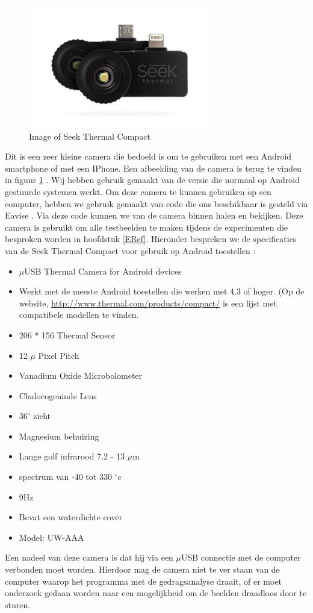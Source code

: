 \begin{figure}[hbp]
	\includegraphics[scale=0.75]{SeekThermalCompac}
	\caption{Image of Seek Thermal Compact}
	\label{imgSTC}
\end{figure}
Dit is een zeer kleine camera die bedoeld is om te gebruiken met een Android smartphone of met een IPhone. Een afbeelding van de camera is terug te vinden in figuur \ref{imgSTC} \cite{bibImgSTC}. Wij hebben gebruik gemaakt van de versie die normaal op Android gestuurde systemen werkt. Om deze camera te kunnen gebruiken op een computer, hebben we gebruik gemaakt van code die ons beschikbaar is gesteld via Eavise \cite{bibSTC}. Via deze code kunnen we van de camera binnen halen en bekijken. Deze camera is gebruikt om alle testbeelden te maken tijdens de experimenten die besproken worden in hoofdstuk \ref{ERef}. Hieronder bespreken we de specificaties van de Seek Thermal Compact voor gebruik op Android toestellen \cite{bibImgSTC}: 
\begin{itemize}
	\item $\mu$USB Thermal Camera for Android devices
	\item Werkt met de meeste Android toestellen die werken met 4.3 of hoger. (Op de website, \url{http://www.thermal.com/products/compact/} is een lijst met compatibele modellen te vinden. 
	\item 206 * 156 Thermal Sensor
	\item 12 $\mu$ Pixel Pitch
	\item Vanadium Oxide Microbolometer
	\item Chalocogeninde Lens
	\item $36^{\circ}$ zicht
	\item Magnesium behuizing
	\item Lange golf infrarood 7.2 - 13 $\mu$m
	\item  spectrum van -40 tot 330 $^{\circ}$c
	\item 9Hz
	\item Bevat een waterdichte cover
	\item Model: UW-AAA
\end{itemize}
Een nadeel van deze camera is dat hij via een $\mu$USB connectie met de computer verbonden moet worden. Hierdoor mag de camera niet te ver staan van de computer waarop het programma met de gedragsanalyse draait, of er moet onderzoek gedaan worden naar een mogelijkheid om de beelden draadloos door te sturen.


